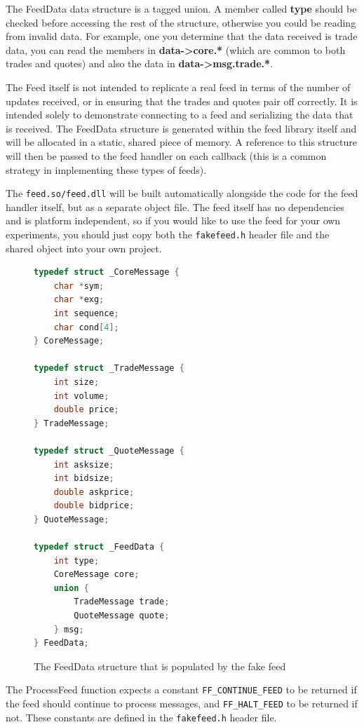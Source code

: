 The FeedData data structure is a tagged union. A member called \textbf{type} should
be checked before accessing the rest of the structure, otherwise you could be reading
from invalid data. For example, one you determine that the data received is trade data,
you can read the members in \textbf{data->core.*} (which are common to both trades and
quotes) and also the data in \textbf{data->msg.trade.*}.

The Feed itself is not intended to replicate a real feed in terms of the number of updates
received, or in ensuring that the trades and quotes pair off correctly. It is intended solely
to demonstrate connecting to a feed and serializing the data that is received.  The FeedData
structure is generated within the feed library itself and will be allocated in a static, shared
piece of memory. A reference to this structure will then be passed to the feed handler on each
callback (this is a common strategy in implementing these types of feeds).

The \verb|feed.so/feed.dll| will be built automatically alongside the code for the feed handler
itself, but as a separate object file. The feed itself has no dependencies and is platform
independent, so if you would like to use the feed for your own experiments, you should just copy
both the \verb|fakefeed.h| header file and the shared object into your own project.

\begin{figure}[h]
\begin{lstlisting}[language=C]
typedef struct _CoreMessage {
	char *sym;
	char *exg;
	int sequence;
	char cond[4];
} CoreMessage;

typedef struct _TradeMessage {
	int size;
	int volume;
	double price;
} TradeMessage;

typedef struct _QuoteMessage {
	int asksize;
	int bidsize;
	double askprice;
	double bidprice;
} QuoteMessage;

typedef struct _FeedData {
	int type;
	CoreMessage core;
	union {
		TradeMessage trade;
		QuoteMessage quote;
	} msg;
} FeedData;

\end{lstlisting}
\caption{The FeedData structure that is populated by the fake feed}
\end{figure}

The ProcessFeed function expects a constant \verb|FF_CONTINUE_FEED| to be returned if the feed should continue to process messages,
and \verb|FF_HALT_FEED| to be returned if not. These constants are defined in the \verb|fakefeed.h| header file.


